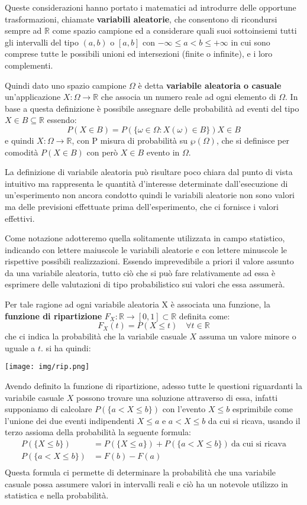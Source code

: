 \documentclass[a4paper,12pt, oneside]{book}
\newcommand{\numberset}{\mathbb}
\newcommand{\R}{\numberset{R}}
\begin{document}
Queste considerazioni hanno portato i matematici ad introdurre delle opportune
trasformazioni, chiamate \textbf{variabili aleatorie}, che consentono di ricondursi
sempre ad $\R$ come spazio campione ed a considerare quali suoi sottoinsiemi tutti
gli intervalli del tipo $(a,b)$ o $[a,b]$ con $-\infty\leq a<b\leq +\infty$
in cui sono comprese tutte le possibili unioni ed intersezioni (finite o infinite), e i loro complementi.

Quindi dato uno spazio campione $\Omega$ è detta \textbf{variabile aleatoria o casuale} un'applicazione $X:\Omega \to \R$
che associa un numero reale ad ogni elemento di $\Omega$.\newline
In base a questa definizione è possibile assegnare delle probabilità ad eventi del tipo $X \in B \subseteq \R$
essendo:
\[ P(X \in B) = P(\{\omega \in \Omega : X(\omega) \in B\}) X\in B \]
e quindi $X: \Omega \to \R$, con P misura di probabilità su $\wp(\Omega)$,
che si definisce per comodità $P(X\in B)$ con però $X\in B$ evento in $\Omega$.

La definizione di variabile aleatoria può risultare poco chiara dal punto di vista
intuitivo ma rappresenta le quantità d'interesse determinate dall'esecuzione di un'esperimento
non ancora condotto quindi le variabili aleatorie non sono valori ma delle previsioni effettuate
prima dell'esperimento, che ci fornisce i valori effettivi.

Come notazione adotteremo quella solitamente utilizzata in campo statistico,
indicando con lettere maiuscole le variabili aleatorie e con lettere minuscole le rispettive possibili realizzazioni.\newline
Essendo imprevedibile a priori il valore assunto da una variabile aleatoria, tutto ciò che si può fare 
relativamente ad essa è esprimere delle valutazioni di tipo probabilistico sui valori che essa assumerà.

Per tale ragione ad ogni variabile aleatoria X è associata una funzione,
la \textbf{funzione di ripartizione} $F_X: \R \to [0, 1] \subset \R$ definita come:
\[ F_X(t) = P(X \leq t) \quad \forall t \in \R \]
che ci indica la probabilità che la variabile casuale $X$ assuma un valore minore o uguale a $t$.
si ha quindi:
\begin{center}
\texttt{[image: img/rip.png]}
\end{center}
Avendo definito la funzione di ripartizione, adesso tutte le questioni riguardanti la variabile casuale $X$
possono trovare una soluzione attraverso di essa, infatti supponiamo di calcolare $P(\{a < X \leq b\})$
con l'evento ${X \leq b}$ esprimibile come l'unione dei due eventi indipendenti ${X \leq a}$ e ${a < X \leq b}$ da cui si ricava,
usando il terzo assioma della probabilità la seguente formula:
\[ \begin{split}
        P(\{X \leq b\}) & = P(\{X \leq a\}) + P(\{a < X \leq b\}) \ \text{da cui si ricava} \\
        P(\{a < X \leq b\}) & = F(b) - F(a) \\
    \end{split} \]
Questa formula ci permette di determinare la probabilità che una variabile casuale possa assumere valori in intervalli reali
e ciò ha un notevole utilizzo in statistica e nella probabilità.
\end{document}
